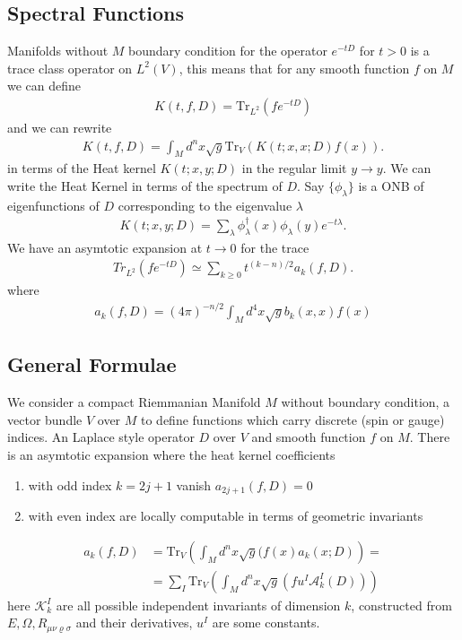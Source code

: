 \documentclass[a4paper]{article}
\theoremstyle{definition}
\theoremstyle{definition}
\theoremstyle{definition}
\theoremstyle{theorem}
\theoremstyle{theorem}
\theoremstyle{theorem}
\begin{document}
\subsection{Spectral Functions}
Manifolds without $M$ boundary condition for the operator $e^{-tD}$ for $t>0$ is a
trace class operator on $L^2(V)$, this means that for any smooth function $f$
on $M$ we can define
\begin{align}
    K(t,f,D) = \text{Tr}_{L^2}(fe^{-tD})
\end{align}
and we can rewrite
\begin{align}
    K(t, f, D) = \int_M d^n x \sqrt{g} \text{Tr}_V(K(t;x,x;D)f(x)).
\end{align}
in terms of the Heat kernel $K(t;x,y;D)$ in the regular limit $y\rightarrow y$.
We can write the Heat Kernel in terms of the spectrum of $D$. Say
$\{\phi_\lambda\}$ is a ONB of eigenfunctions of $D$ corresponding to the
eigenvalue $\lambda$
\begin{align}
    K(t;x,y;D) = \sum_\lambda \phi^\dagger_\lambda(x)
    \phi_\lambda(y)e^{-t\lambda}.
\end{align}
We have an asymtotic expansion at $t \rightarrow 0$  for the trace
\begin{align}
    Tr_{L^2}(fe^{-tD}) \simeq \sum_{k\geq 0}t^{(k-n)/2}a_k(f,D).
\end{align}
where
\begin{align}
    a_k(f,D) = (4\pi)^{-n/2} \int_M d^4x \sqrt{g} b_k(x,x) f(x)
\end{align}
\subsection{General Formulae}
We consider a compact Riemmanian Manifold $M$ without boundary condition, a
vector bundle $V$ over $M$ to define functions which carry discrete (spin or
gauge) indices. An Laplace style operator $D$ over $V$ and smooth function $f$
on $M$. There is an asymtotic expansion where the heat kernel coefficients
\begin{enumerate}
    \item with odd index $k=2j+1$ vanish
        $a_{2j+1}(f,D) = 0$
    \item with even index are locally computable in terms of geometric
        invariants
\end{enumerate}
\begin{align}
    a_k(f,D) &= \text{Tr}_V\left(\int_M d^n x\sqrt{g}(f(x)a_k(x;D)\right) =\\
    &=\sum_I \text{Tr}_V\left(\int_M d^nx \sqrt{g}(fu^I \mathcal{A}^I_k(D))\right)
\end{align}
here $\mathcal{K}^I_k$ are all possible independent invariants of dimension
$k$, constructed from $E, \Omega, R_{\mu\nu\varrho\sigma}$ and their
derivatives, $u^I$ are some constants.
\end{document}
